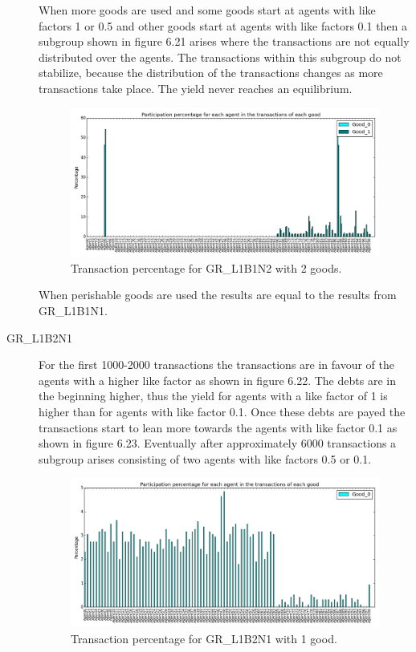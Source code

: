 \documentclass[twoside,openright]{uva-bachelor-thesis}
\begin{document}
\begin{description}
When more goods are used and some goods start at agents with like factors 1 or 0.5 and other goods start at agents with like factors 0.1 then a subgroup shown in figure 6.21 arises where the transactions are not equally distributed over the agents. The transactions within this subgroup do not stabilize, because the distribution of the transactions changes as more transactions take place. The yield never reaches an equilibrium. \\
\begin{figure}[h!]
\centering
\includegraphics[scale=0.4]{Simulation_figures/GR_L1B1N2/2goods_spikes}
\caption{Transaction percentage for GR\_L1B1N2 with 2 goods.}
\end{figure}

When perishable goods are used the results are equal to the results from GR\_L1B1N1.
\clearpage
\item[GR\_L1B2N1] For the first 1000-2000 transactions the transactions are in favour of the agents with a higher like factor as shown in figure 6.22. The debts are in the beginning higher, thus the yield for agents with a like factor of 1 is higher than for agents with like factor 0.1. Once these debts are payed the transactions start to lean more towards the agents with like factor 0.1 as shown in figure 6.23. Eventually after approximately 6000 transactions a subgroup arises consisting of two agents with like factors 0.5 or 0.1.
\begin{figure}[h!]
\centering
\includegraphics[scale=0.4]{Simulation2_figures/GR_L1B2N1_1good_2k} 
\caption{Transaction percentage for GR\_L1B2N1 with 1 good.}
\end{figure}


\end{description}
\end{document}

